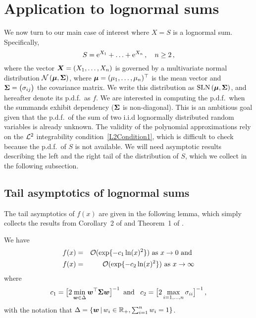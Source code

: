 \section{Application to  lognormal sums}\label{S:LN_Appl}
We now turn to our main case of interest where $X=S$ is a lognormal sum. Specifically,
\begin{equation}\label{7.12a}
S=\mathrm{e}^{X_{1}}+\ldots+\mathrm{e}^{X_n} \,,\quad n \ge 2\,,
\end{equation}
where the vector $\bm{X}=\left(X_{1},\ldots,X_{n}\right)$ is governed by a multivariate normal distribution $\mathcal{N}\left(\bm{\mu}, \bm{\Sigma}\right)$, where $\bm{\mu}=(\mu_{1},\ldots,\mu_{n})^\top$ is the mean vector and $\bm{\Sigma}=\left(\sigma_{ij}\right)$ the covariance matrix.
We write this distribution as $\mathrm{SLN}\left(\bm{\mu}, \bm{\Sigma} \right)$, and hereafter denote its p.d.f.\ as $f$. We are interested in computing the p.d.f.\ when the summands exhibit dependency ($\bm{\Sigma}$ is non-diagonal). This is an ambitious goal given that the p.d.f.\ of the sum of two i.i.d lognormally distributed random variables is already unknown. The validity of the polynomial approximations rely on the $\mathcal{L}^2$ integrability condition~\eqref{L2Condition1}, which is difficult to check because the p.d.f.\ of $S$ is not available. We will need asymptotic results describing the left and the right tail of the distribution of $S$, which we collect in the following subsection.

\subsection{Tail asymptotics of lognormal sums}\label{SS:LNSumsAsympt}

The tail asymptotics of $f(x)$ are given in the following lemma, which simply collects the results from Corollary~2 of \cite{tankov2015tail} and Theorem~1 of \cite{asmussen2008asymptotics}.

\begin{lemma} \label{le:SLNTails}
We have
\begin{eqnarray}
	f(x) &=&  {\mathcal{O}} ( \exp\{-c_1 \ln(x)^2 \} ) \text{ as }x\to 0 \text{ and } \label{SLNLeftTail} \\
	f(x) &=& {\mathcal{O}} ( \exp\{-c_2 \ln(x)^2 \} ) \text{ as }x\to \infty \label{SLNRightTail}
\end{eqnarray}
where
\[
	c_1 = \big[ 2 \min_{\bm{w} \in \Delta} \bm{w}^\top \bm{\Sigma} \bm{w} \big]^{-1} \, \text{ and } \,\,\, c_2 = \big[ 2 \max_{i=1,\dots,n} \sigma_{ii} \big]^{-1}  \,,
\]
with the notation that $\Delta = \{ \bm{w} \,|\, w_i \in \mathbb{R}_+, \sum_{i=1}^n w_i = 1 \}$.
\end{lemma}

